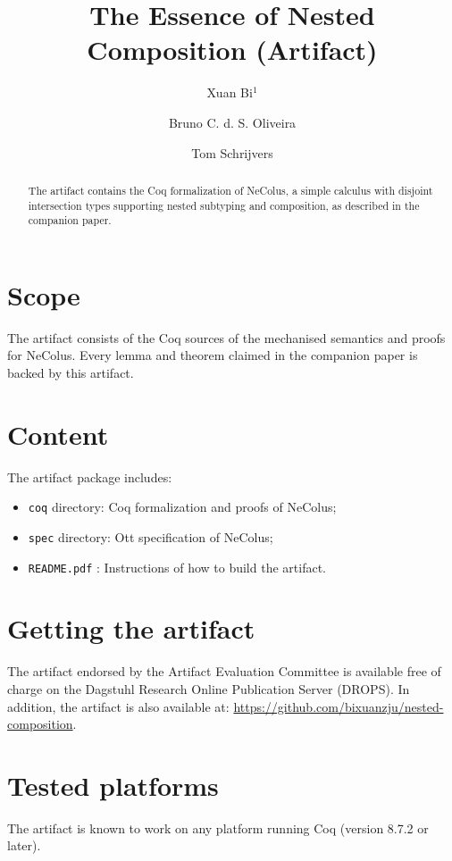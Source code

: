 \documentclass[a4paper,UKenglish]{darts-v2018}
\title{The Essence of Nested Composition (Artifact)}
\author{Xuan Bi$^1$}{The University of Hong Kong, Hong Kong, China}{xbi@cs.hku.hk}{}{}%
\author{Bruno C. d. S. Oliveira}{The University of Hong Kong, Hong Kong, China}{bruno@cs.hku.hk}{}{Funded by Hong Kong Research Grant Council projects number 17210617 and 17258816}
\author{Tom Schrijvers}{KU Leuven, Belgium}{tom.schrijvers@cs.kuleuven.be}{}{Funded by The Research Foundation - Flanders}
\newenvironment{scope}{\section{Scope}}{}
\newenvironment{content}{\section{Content}}{}
\newenvironment{getting}{\section{Getting the artifact} The artifact 
endorsed by the Artifact Evaluation Committee is available free of 
charge on the Dagstuhl Research Online Publication Server (DROPS).}{}
\newenvironment{platforms}{\section{Tested platforms}}{}
\newcommand{\name}{\textsf{NeColus}\xspace}
\begin{document}
\maketitle

\begin{abstract}
  The artifact contains the Coq formalization of \name,  a simple calculus with
  disjoint intersection types supporting nested subtyping and composition, as described
  in the companion paper.
 \end{abstract}


\begin{scope}
  The artifact consists of the Coq sources of the mechanised semantics and proofs for \name. Every lemma and theorem
  claimed in the companion paper is backed by this artifact.
\end{scope}

\begin{content}
The artifact package includes:
\begin{itemize}
\item \texttt{coq} directory: Coq formalization and proofs of \name;
\item \texttt{spec} directory: Ott specification of \name;
\item \texttt{README.pdf} : Instructions of how to build the artifact.
\end{itemize}
\end{content}

\begin{getting}
In addition, the artifact is also available at:
\url{https://github.com/bixuanzju/nested-composition}.
\end{getting}

\begin{platforms}
  The artifact is known to work on any platform running Coq (version 8.7.2 or later).
\end{platforms}
\end{document}
